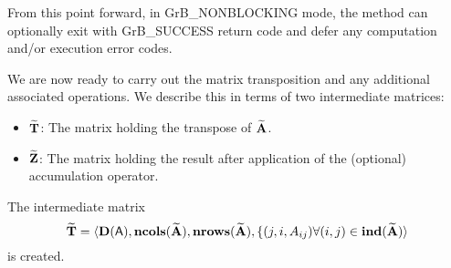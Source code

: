 From this point forward, in {\sf GrB\_NONBLOCKING} mode, the method can 
optionally exit with {\sf GrB\_SUCCESS} return code and defer any computation 
and/or execution error codes.

We are now ready to carry out the matrix transposition and any additional 
associated operations.  We describe this in terms of two intermediate matrices:
\begin{itemize}
    \item ${\bf \widetilde{T}}$: The matrix holding the  transpose of
    ${\bf \widetilde{A}}$.
    \item ${\bf \widetilde{Z}}$: The matrix holding the result after 
    application of the (optional) accumulation operator.
\end{itemize}

The intermediate matrix
\[
{\bf \widetilde{T}} = \langle
\bold{D}({\bf \sf A}), \bold{ncols}({\bf \widetilde{A}}),
\bold{nrows}({\bf \widetilde{A}}), 
\{(j,i,A_{ij}) \forall (i,j) \in \bold{ind}({\bf \widetilde{A}}) 
\rangle
\]
is created.  




